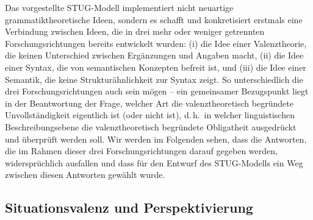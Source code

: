 Das vorgestellte STUG-Modell implementiert nicht neuartige grammatiktheoretische Ideen, sondern es schafft und konkretisiert erstmals eine Verbindung zwischen Ideen, die in drei mehr oder weniger getrennten Forschungsrichtungen bereits entwickelt wurden: (i) die Idee einer Valenztheorie, die keinen Unterschied zwischen Ergänzungen und Angaben macht, (ii) die Idee einer Syntax, die von semantischen Konzepten befreit ist, und (iii) die Idee einer Semantik, die keine Strukturähnlichkeit zur Syntax zeigt. So unterschiedlich die drei Forschungsrichtungen auch sein mögen -- ein gemeinsamer Bezugspunkt liegt  in der Beantwortung der Frage, welcher Art die valenztheoretisch begründete Unvollständigkeit eigentlich ist (oder nicht ist), d.\,h.\ in welcher linguistischen Beschreibungsebene die valenztheoretisch begründete Obligatheit ausgedrückt und überprüft werden soll. Wir werden im Folgenden sehen, dass die Antworten, die im Rahmen dieser drei Forschungsrichtungen darauf gegeben werden, widersprüchlich ausfallen und dass für den Entwurf des STUG-Modells ein Weg zwischen diesen Antworten gewählt wurde.

\subsection{Situationsvalenz und Perspektivierung} \label{sec-stug-valenz}\label{sec-situationsvalenz}

